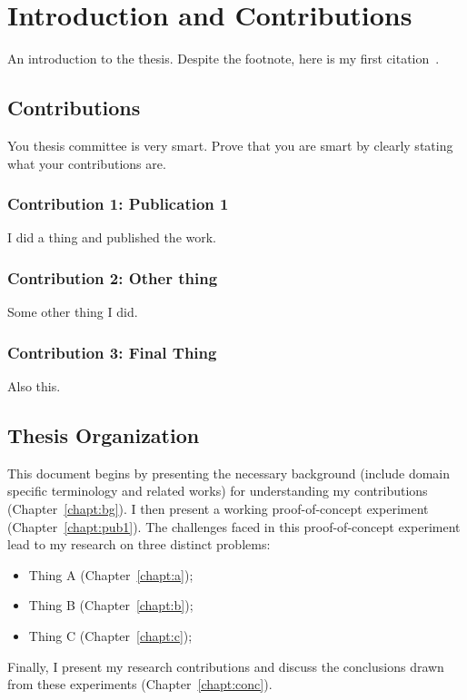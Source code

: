 \chapter{Introduction and Contributions}
\label{chapt:intro}


An introduction to the thesis.
Despite the footnote, here is my first citation~\cite{jefferson-tw}.



\section{Contributions}

You thesis committee is very smart.
Prove that you are smart by clearly stating what your contributions are.

\subsection{Contribution 1: Publication 1}

I did a thing and published the work.

\subsection{Contribution 2: Other thing}

Some other thing I did.

\subsection{Contribution 3: Final Thing}

Also this.

\section{Thesis Organization}

This document begins by presenting the necessary background (include domain specific terminology and related works) for understanding my contributions (Chapter~\ref{chapt:bg}).
I then present a working proof-of-concept experiment (Chapter~\ref{chapt:pub1}).
The challenges faced in this proof-of-concept experiment lead to my research on three distinct problems:
\begin{itemize}
  \item Thing A (Chapter~\ref{chapt:a});
  \item Thing B (Chapter~\ref{chapt:b});
  \item Thing C (Chapter~\ref{chapt:c});
\end{itemize}
Finally, I present my research contributions and discuss the conclusions drawn from these experiments (Chapter~\ref{chapt:conc}).
